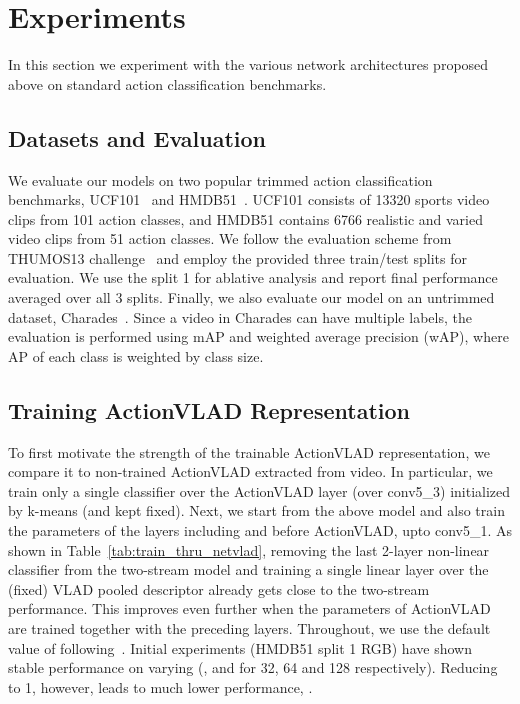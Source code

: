 \documentclass[10pt,twocolumn,letterpaper]{article}
\newcommand{\methodTag}[0]{ActionVLAD}
\begin{document}
 \section{Experiments}

In this section we experiment with the various network
architectures proposed above on standard
action classification benchmarks.

\subsection{Datasets and Evaluation}
We evaluate our models on two popular trimmed action
classification benchmarks,
UCF101~\cite{ucf101} and HMDB51~\cite{hmdb51}.
UCF101 consists of 13320 sports video clips
from 101 action classes,
and HMDB51 contains 6766 realistic and varied video clips from
51 action classes. We follow the evaluation
scheme from THUMOS13 challenge~\cite{THUMOS13} and
employ the provided three train/test splits for
evaluation.
We use the split 1 for ablative analysis and
report final performance averaged over all 3 splits.
Finally, we also evaluate our model on an
untrimmed dataset, Charades~\cite{charades}.
Since a video in Charades can have multiple labels,
the evaluation is performed using mAP and weighted
average precision (wAP), where AP of each class
is weighted by class size.

\subsection{Training \methodTag{} Representation}

To first motivate the strength of the trainable \methodTag{} representation,
we compare it to non-trained \methodTag{} extracted from video.
In particular, we train only a single classifier over the \methodTag{} layer (over conv5\_3) initialized by k-means (and kept fixed).
Next, we start from the above model 
and also train the parameters of the 
layers including and before \methodTag{},
upto conv5\_1. As shown in Table~\ref{tab:train_thru_netvlad}, 
removing the last 2-layer non-linear classifier from the
two-stream model and training a single 
linear layer over the (fixed) VLAD pooled
descriptor already gets close to the two-stream performance.
This improves even further when the parameters of \methodTag{} are trained together with the preceding layers.
Throughout, we use the default value of 
following~\cite{Arandjelovic16}. Initial 
experiments (HMDB51 split 1 RGB) have shown stable 
performance on varying 
(,  and  for 
32, 64 and 128 respectively).
Reducing  to 1, however, leads
to much lower performance, .
\end{document}
